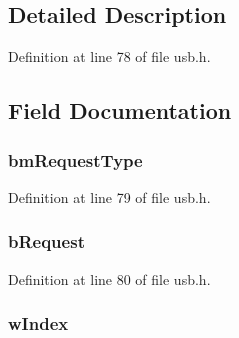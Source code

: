 \subsection{Detailed Description}


Definition at line 78 of file usb.h.



\subsection{Field Documentation}
\hypertarget{struct___u_s_b___s_e_t_u_p___p_a_c_k_e_t_a8be0eb8a27686ac4f4831003b5c6f792}{
\subsubsection[{bmRequestType}]{ {\bf bmRequestType}}}
\label{struct___u_s_b___s_e_t_u_p___p_a_c_k_e_t_a8be0eb8a27686ac4f4831003b5c6f792}


Definition at line 79 of file usb.h.

\hypertarget{struct___u_s_b___s_e_t_u_p___p_a_c_k_e_t_a7bab96f30abf205e60392ab8e8339be7}{
\subsubsection[{bRequest}]{ {\bf bRequest}}}
\label{struct___u_s_b___s_e_t_u_p___p_a_c_k_e_t_a7bab96f30abf205e60392ab8e8339be7}


Definition at line 80 of file usb.h.

\hypertarget{struct___u_s_b___s_e_t_u_p___p_a_c_k_e_t_aeca4b5d6b50d0b1b2db278cb4efc0436}{
\subsubsection[{wIndex}]{ {\bf wIndex}}}
\label{struct___u_s_b___s_e_t_u_p___p_a_c_k_e_t_aeca4b5d6b50d0b1b2db278cb4efc0436}


